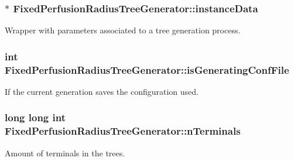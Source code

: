 \subsubsection[{\texorpdfstring{instance\+Data}{instanceData}}]{$\ast$ Fixed\+Perfusion\+Radius\+Tree\+Generator\+::instance\+Data\hspace{0.3cm}{\ttfamily [private]}}\hypertarget{class_fixed_perfusion_radius_tree_generator_a00f2d253632c5188a13576d614586d02}{}\label{class_fixed_perfusion_radius_tree_generator_a00f2d253632c5188a13576d614586d02}
Wrapper with parameters associated to a tree generation process. 
\subsubsection[{\texorpdfstring{is\+Generating\+Conf\+File}{isGeneratingConfFile}}]{\setlength{\rightskip}{0pt plus 5cm}int Fixed\+Perfusion\+Radius\+Tree\+Generator\+::is\+Generating\+Conf\+File\hspace{0.3cm}{\ttfamily [private]}}\hypertarget{class_fixed_perfusion_radius_tree_generator_aa4e8b9db77041b6981d1747835faaafe}{}\label{class_fixed_perfusion_radius_tree_generator_aa4e8b9db77041b6981d1747835faaafe}
If the current generation saves the configuration used. 
\subsubsection[{\texorpdfstring{n\+Terminals}{nTerminals}}]{\setlength{\rightskip}{0pt plus 5cm}long long int Fixed\+Perfusion\+Radius\+Tree\+Generator\+::n\+Terminals\hspace{0.3cm}{\ttfamily [private]}}\hypertarget{class_fixed_perfusion_radius_tree_generator_a7f47f9518335cd88504f2575d75a6935}{}\label{class_fixed_perfusion_radius_tree_generator_a7f47f9518335cd88504f2575d75a6935}
Amount of terminals in the trees. 
